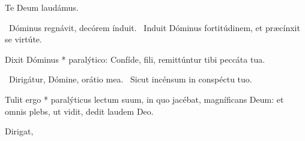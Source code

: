Te Deum laudámus.


\V\ Dóminus regnávit, decórem índuit. \R\ Induit Dóminus fortitúdinem, et præcínxit se virtúte.

 Dixit Dóminus * paralýtico: Confíde, fili, remittúntur tibi peccáta tua.


\V\ Dirigátur, Dómine, orátio mea. \R\ Sicut incénsum in conspéctu tuo.

 Tulit ergo * paralýticus lectum suum, in quo jacébat, magníficans Deum: et omnis plebs, ut vidit, dedit laudem Deo.

 Dirigat, 

